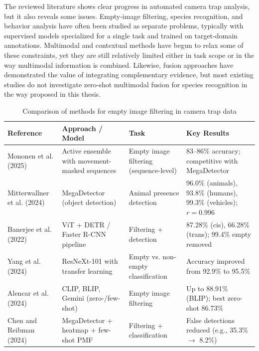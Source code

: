 The reviewed literature shows clear progress in automated camera trap analysis, but it also reveals some issues. Empty-image filtering, species recognition, and behavior analysis have often been studied as separate problems, typically with supervised models specialized for a single task and trained on target-domain annotations. Multimodal and contextual methods have begun to relax some of these constraints, yet they are still relatively limited either in task scope or in the way multimodal information is combined. Likewise, fusion approaches have demonstrated the value of integrating complementary evidence, but most existing studies do not investigate zero-shot multimodal fusion for species recognition in the way proposed in this thesis.

\begin{table}[ht]
\centering
\footnotesize
\caption{Comparison of methods for empty image filtering in camera trap data}
\label{tab:empty_filtering}
\begin{tabular}{p{3cm} p{4.5cm} p{2.5cm} p{4cm}}
\hline
\textbf{Reference} & \textbf{Approach / Model} & \textbf{Task} & \textbf{Key Results} \\
\hline
Mononen et al. (2025) \cite{mononen2025active} & Active ensemble with movement-masked sequences & Empty image filtering (sequence-level) & 83--86\% accuracy; competitive with MegaDetector \\
Mitterwallner et al. (2024) \cite{mitterwallner2024automated} & MegaDetector (object detection) & Animal presence detection & 96.0\% (animals), 93.8\% (humans), 99.3\% (vehicles); $r=0.996$ \\
Banerjee et al. (2022) \cite{banerjee2022sieving} & ViT + DETR / Faster R-CNN pipeline & Filtering + detection & 87.28\% (cis), 66.28\% (trans); 99.4\% empty removed \\
Yang et al. (2024) \cite{yang2024systematic} & ResNeXt-101 with transfer learning & Empty vs. non-empty classification & Accuracy improved from 92.9\% to 95.5\% \\
Alencar et al. (2024) \cite{alencar2024zero} & CLIP, BLIP, Gemini (zero-/few-shot) & Empty image filtering & Up to 88.91\% (BLIP); best zero-shot 86.73\% \\
Chen and Reibman (2024) \cite{chen2024minimizing} & MegaDetector + heatmap + few-shot PMF & Filtering + classification & False detections reduced (e.g., 35.3\% $\rightarrow$ 8.2\%) \\
\hline
\end{tabular}
\end{table}

